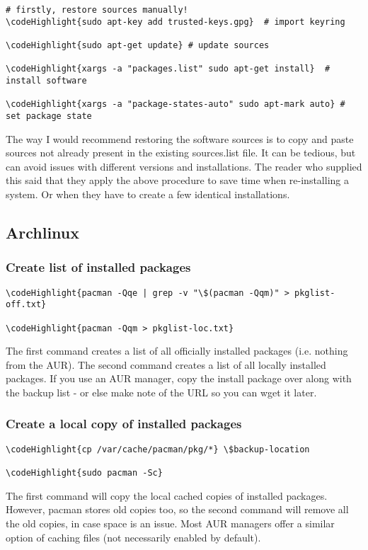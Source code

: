 \documentclass[12pt,a4paper]{article}
\begin{document}
\begin{Verbatim}[commandchars=\\\{\}]
# firstly, restore sources manually!
\codeHighlight{sudo apt-key add trusted-keys.gpg}  # import keyring

\codeHighlight{sudo apt-get update} # update sources

\codeHighlight{xargs -a "packages.list" sudo apt-get install}  # install software

\codeHighlight{xargs -a "package-states-auto" sudo apt-mark auto} # set package state
\end{Verbatim}
The way I would recommend restoring the software sources is to copy and paste sources not already present in the existing sources.list file.  It can be tedious, but can avoid issues with different versions and installations.  The reader who supplied this said that they apply the above procedure to save time when re-installing a system. Or when they have to create a few identical installations.

\subsection{Archlinux}

\subsubsection{Create list of installed packages}
\label{Arch-installed-packages}
\begin{Verbatim}[commandchars=\\\{\}]
\codeHighlight{pacman -Qqe | grep -v "\$(pacman -Qqm)" > pkglist-off.txt}

\codeHighlight{pacman -Qqm > pkglist-loc.txt}
\end{Verbatim}
The first command creates a list of all officially installed packages (i.e. nothing from the AUR).  The second command creates a list of all locally installed packages.  If you use an AUR manager, copy the install package over along with the backup list - or else make note of the URL so you can wget it later.

\subsubsection{Create a local copy of installed packages}
\begin{Verbatim}[commandchars=\\\{\}]
\codeHighlight{cp /var/cache/pacman/pkg/*} \$backup-location

\codeHighlight{sudo pacman -Sc}
\end{Verbatim}
The first command will copy the local cached copies of installed packages.  However, pacman stores old copies too, so the second command will remove all the old copies, in case space is an issue.  Most AUR managers offer a similar option of caching files (not necessarily enabled by default).
\end{document}
